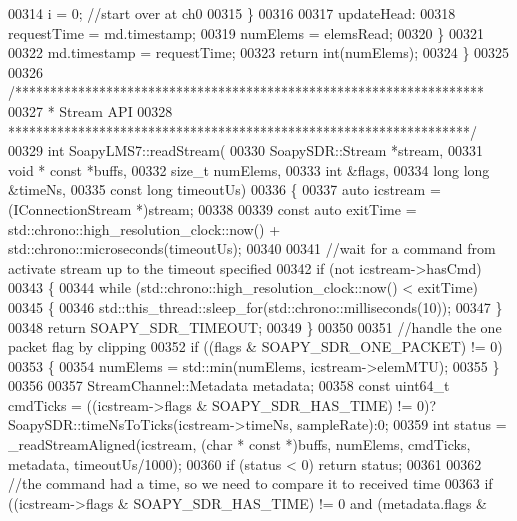 \begin{DoxyCode}
00314             i = 0; \textcolor{comment}{//start over at ch0}
00315         \}
00316 
00317         updateHead:
00318         requestTime = md.timestamp;
00319         numElems = elemsRead;
00320     \}
00321 
00322     md.timestamp = requestTime;
00323     \textcolor{keywordflow}{return} int(numElems);
00324 \}
00325 
00326 \textcolor{comment}{/*******************************************************************}
00327 \textcolor{comment}{ * Stream API}
00328 \textcolor{comment}{ ******************************************************************/}
00329 \textcolor{keywordtype}{int} SoapyLMS7::readStream(
00330     SoapySDR::Stream *stream,
00331     \textcolor{keywordtype}{void} * \textcolor{keyword}{const} *buffs,
00332     \textcolor{keywordtype}{size\_t} numElems,
00333     \textcolor{keywordtype}{int} &flags,
00334     \textcolor{keywordtype}{long} \textcolor{keywordtype}{long} &timeNs,
00335     \textcolor{keyword}{const} \textcolor{keywordtype}{long} timeoutUs)
00336 \{
00337     \textcolor{keyword}{auto} icstream = (IConnectionStream *)stream;
00338 
00339     \textcolor{keyword}{const} \textcolor{keyword}{auto} exitTime = std::chrono::high\_resolution\_clock::now() + std::chrono::microseconds(timeoutUs);
00340 
00341     \textcolor{comment}{//wait for a command from activate stream up to the timeout specified}
00342     \textcolor{keywordflow}{if} (not icstream->hasCmd)
00343     \{
00344         \textcolor{keywordflow}{while} (std::chrono::high\_resolution\_clock::now() < exitTime)
00345         \{
00346             std::this\_thread::sleep\_for(std::chrono::milliseconds(10));
00347         \}
00348         \textcolor{keywordflow}{return} SOAPY_SDR_TIMEOUT;
00349     \}
00350 
00351     \textcolor{comment}{//handle the one packet flag by clipping}
00352     \textcolor{keywordflow}{if} ((flags & SOAPY_SDR_ONE_PACKET) != 0)
00353     \{
00354         numElems = std::min(numElems, icstream->elemMTU);
00355     \}
00356 
00357     StreamChannel::Metadata metadata;
00358     \textcolor{keyword}{const} uint64\_t cmdTicks = ((icstream->flags & SOAPY_SDR_HAS_TIME) != 0)?
      SoapySDR::timeNsToTicks(icstream->timeNs, sampleRate):0;
00359     \textcolor{keywordtype}{int} status = \_readStreamAligned(icstream, (\textcolor{keywordtype}{char} * \textcolor{keyword}{const} *)buffs, numElems, cmdTicks, metadata, 
      timeoutUs/1000);
00360     \textcolor{keywordflow}{if} (status < 0) \textcolor{keywordflow}{return} status;
00361 
00362     \textcolor{comment}{//the command had a time, so we need to compare it to received time}
00363     \textcolor{keywordflow}{if} ((icstream->flags & SOAPY_SDR_HAS_TIME) != 0 and (metadata.flags & 

\end{DoxyCode}
